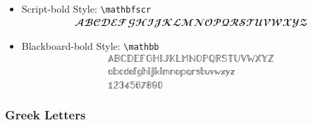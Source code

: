 \documentclass[
	12pt,
	]{article}
\numberwithin{equation}{section}
\newcommand{\com}[1]{\texttt{\textbackslash #1}}
\theoremstyle{definition}
\theoremstyle{plain}
\theoremstyle{plain}
\theoremstyle{plain}
\begin{document}
\begin{itemize}
	\item Script-bold Style: \com{mathbfscr}
	\begin{gather*}
		\mathbfscr{
			A B C D E F G H I J K L M N O P Q R S T U V W X Y Z
		}
	\end{gather*}
	
	\item Blackboard-bold Style: \com{mathbb}
	\begin{gather*}
		\mathbb{
			A B C D E F G H I J K L M N O P Q R S T U V W X Y Z
		}\\
		\mathbb{
			a b c d e f g h i j k l m n o p q r s t u v w x y z
		}\\
		\mathbb{
			1 2 3 4 5 6 7 8 9 0
		}
	\end{gather*}
	
\end{itemize}

\newpage

\subsubsection{Greek Letters}

\vspace*{0.5cm}
\end{document}
